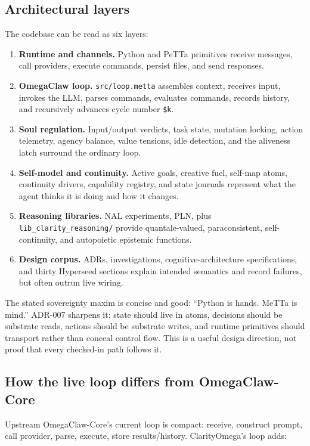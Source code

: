\documentclass[11pt]{article}
\begin{document}
\subsection{Architectural layers}

The codebase can be read as six layers:

\begin{enumerate}
\item \textbf{Runtime and channels.}  Python and PeTTa primitives receive
messages, call providers, execute commands, persist files, and send responses.
\item \textbf{OmegaClaw loop.}  \texttt{src/loop.metta} assembles context,
receives input, invokes the LLM, parses commands, evaluates commands, records
history, and recursively advances cycle number \texttt{\$k}.
\item \textbf{Soul regulation.}  Input/output verdicts, task state, mutation
locking, action telemetry, agency balance, value tensions, idle detection, and
the aliveness latch surround the ordinary loop.
\item \textbf{Self-model and continuity.}  Active goals, creative fuel,
self-map atoms, continuity drivers, capability registry, and state journals
represent what the agent thinks it is doing and how it changes.
\item \textbf{Reasoning libraries.}  NAL experiments, PLN, plus
\texttt{lib\_clarity\_reasoning/} provide quantale-valued, paraconsistent,
self-continuity, and autopoietic epistemic functions.
\item \textbf{Design corpus.}  ADRs, investigations, cognitive-architecture
specifications, and thirty Hyperseed sections explain intended semantics and
record failures, but often outrun live wiring.
\end{enumerate}

The stated sovereignty maxim is concise and good: ``Python is hands. MeTTa is
mind.''  ADR-007 sharpens it: state should live in atoms, decisions should be
substrate reads, actions should be substrate writes, and runtime primitives
should transport rather than conceal control flow.  This is a useful design
direction, not proof that every checked-in path follows it.

\subsection{How the live loop differs from OmegaClaw-Core}

Upstream OmegaClaw-Core's current loop is compact: receive, construct prompt,
call provider, parse, execute, store results/history.  ClarityOmega's loop adds:
\end{document}
